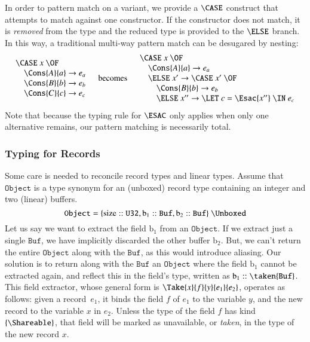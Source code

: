 \documentclass[9pt\ifFinal\else,preprint,nocopyrightspace\fi,\ifAlpha\else natbib,authoryear\fi]{sigplanconf}
\begin{document}
In order to pattern match on a variant, we provide a $\CASE$ construct that attempts to match against one constructor. If the constructor does not match, 
it is \emph{removed} from the type and the reduced type is provided to the $\ELSE$ branch. In this way, a traditional multi-way pattern match can be desugared
by nesting:
\begin{displaymath}
\begin{array}{@{}lcl@{}}
 \begin{array}{l}
   \CASE\ x\ \OF \\
  \quad \Cons{A}{a} \rightarrow e_a \\
  \quad \Cons{B}{b} \rightarrow e_b \\
  \quad \Cons{C}{c} \rightarrow e_c 
 \end{array}  & \text{becomes} & \begin{array}{l}
   \CASE\ x\ \OF \\
   \quad \Cons{A}{a} \rightarrow {e_a} \\
   \quad \ELSE\ x' \rightarrow \CASE\ x'\ \OF \\
   \quad\quad \Cons{B}{b} \rightarrow e_b \\
   \quad\quad \ELSE\ x'' \rightarrow \LET\ c = \Esac{x''}\ \IN\ e_c
 \end{array} 
\end{array}
\end{displaymath}
Note that because the typing rule for $\ESAC$ only applies when only one alternative remains, our pattern matching is necessarily total.

\subsubsection{Typing for Records}
\label{sec:records}




Some care is needed to reconcile record types and linear types.
Assume that $\mathtt{Object}$ is a type synonym for an (unboxed) record type containing an integer and two (linear) buffers.
$$ \mathtt{Object} = \{ \text{size} :: \mathtt{U32}, \text{b}_1 :: \mathtt{Buf}, \text{b}_2 :: \mathtt{Buf} \}\ \Unboxed$$
Let us say we want to extract the field $\text{b}_1$ from an $\mathtt{Object}$. If we extract just a single $\mathtt{Buf}$, we have implicitly discarded the other buffer $\text{b}_2$.
But, we can't return the entire $\mathtt{Object}$ along with the $\mathtt{Buf}$, as this would introduce aliasing. Our solution is to return along with the $\mathtt{Buf}$
 an $\mathtt{Object}$ where the field $\text{b}_1$ cannot be extracted again, and reflect this in the field's type, written as $\text{b}_1 :: \taken{\mathtt{Buf}}$. 
This field extractor, whose general form is $\Take{x}{f}{y}{e_1}{e_2}$, operates as follows: given a record~$e_1$, it binds the field $f$ of $e_1$ 
to the variable
$y$, and the new record to the variable $x$ in $e_2$. Unless the type of the field $f$ has kind $\{\Shareable\}$, that field will be marked as unavailable, or \emph{taken}, in the type of the new record $x$.
\end{document}
